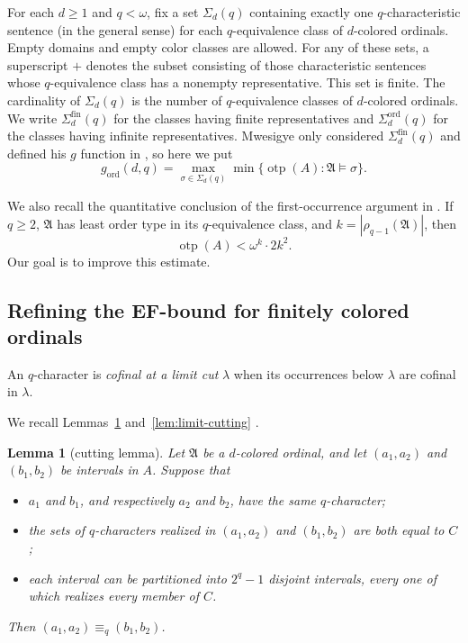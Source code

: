 \documentclass{amsart}
\newtheorem{lemma}{Lemma}
\theoremstyle{definition}
\begin{document}
For each $d\geq 1$ and $q<\omega$, fix a set $\Sigma_d(q)$ containing exactly one $q$-characteristic sentence (in the general sense) for each $q$-equivalence class of $d$-colored ordinals. Empty domains and empty color classes are allowed. For any of these sets, a superscript $+$ denotes the subset consisting of those characteristic sentences whose $q$-equivalence class has a nonempty representative. This set is finite. The cardinality of $\Sigma_d(q)$ is the number of $q$-equivalence classes of $d$-colored ordinals. We write $\Sigma_d^{\mathrm{fin}}(q)$ for the classes having finite representatives and $\Sigma_d^{\mathrm{ord}}(q)$ for the classes having infinite representatives.
Mwesigye only considered $\Sigma_d^{\mathrm{fin}}(q)$ and defined his $g$ function in \cite{Mwesigye2011}, so here we put
$$g_{\mathrm{ord}}(d,q)=\max_{\sigma\in\Sigma_d(q)}\min\{\operatorname{otp}(A):\mathfrak A\models\sigma\}.$$

We also recall the quantitative conclusion of the first-occurrence argument in \cite[Theorem~3.4]{Mwesigye2018}. If $q\geq2$, $\mathfrak A$ has least order type in its $q$-equivalence class, and $k=|\rho_{q-1}(\mathfrak A)|$, then
$$\operatorname{otp}(A)<\omega^k\cdot2k^2.$$
Our goal is to improve this estimate.

\subsection{Refining the EF-bound for finitely colored ordinals}

An $q$-character is \emph{cofinal at a limit cut} $\lambda$ when its occurrences below $\lambda$ are cofinal in $\lambda$.

We recall Lemmas~\ref{lem:cutting} and~\ref{lem:limit-cutting}
\cite[Lemma~3.3]{Mwesigye2018}.

\begin{lemma}[cutting lemma]\label{lem:cutting}
Let $\mathfrak A$ be a $d$-colored ordinal, and let $(a_1,a_2)$ and $(b_1,b_2)$ be intervals in $A$. Suppose that
\begin{itemize}
    \item $a_1$ and $b_1$, and respectively $a_2$ and $b_2$, have the same $q$-character;
    \item the sets of $q$-characters realized in $(a_1,a_2)$ and $(b_1,b_2)$ are both equal to $C$;
    \item each interval can be partitioned into $2^q-1$ disjoint intervals, every one of which realizes every member of $C$.
\end{itemize}
Then $(a_1,a_2)\equiv_q(b_1,b_2)$.
\end{lemma}
\end{document}
